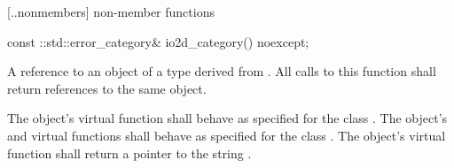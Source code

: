  [\iotwod.\iotwoderrorcategory.nonmembers] { 
non-member functions}

\begin{itemdecl}
  const ::std::error_category& io2d_category() noexcept;
\end{itemdecl}
\begin{itemdescr}
	\pnum
	\returns
	A reference to an object of a type derived from . All 
	calls to this function shall return references to the same object.
	
	\pnum
	\remarks
	The object's  virtual function shall behave 
	as specified for the class . The object's 
	 and  
	virtual functions shall behave as specified for the class 
	. The object's  virtual function 
	shall return a pointer to the string .
\end{itemdescr}
